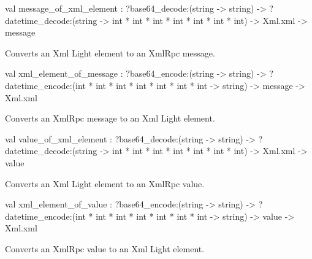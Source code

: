 \documentclass[11pt]{article}
\begin{document}
\label{val:XmlRpc.message-underscoreof-underscorexml-underscoreelement}\begin{ocamldoccode}
val message_of_xml_element :
  ?base64_decode:(string -> string) ->
  ?datetime_decode:(string -> int * int * int * int * int * int * int) ->
  Xml.xml -> message
\end{ocamldoccode}
\begin{ocamldocdescription}
Converts an Xml Light element to an XmlRpc message.


\end{ocamldocdescription}




\label{val:XmlRpc.xml-underscoreelement-underscoreof-underscoremessage}\begin{ocamldoccode}
val xml_element_of_message :
  ?base64_encode:(string -> string) ->
  ?datetime_encode:(int * int * int * int * int * int * int -> string) ->
  message -> Xml.xml
\end{ocamldoccode}
\begin{ocamldocdescription}
Converts an XmlRpc message to an Xml Light element.


\end{ocamldocdescription}




\label{val:XmlRpc.value-underscoreof-underscorexml-underscoreelement}\begin{ocamldoccode}
val value_of_xml_element :
  ?base64_decode:(string -> string) ->
  ?datetime_decode:(string -> int * int * int * int * int * int * int) ->
  Xml.xml -> value
\end{ocamldoccode}
\begin{ocamldocdescription}
Converts an Xml Light element to an XmlRpc value.


\end{ocamldocdescription}




\label{val:XmlRpc.xml-underscoreelement-underscoreof-underscorevalue}\begin{ocamldoccode}
val xml_element_of_value :
  ?base64_encode:(string -> string) ->
  ?datetime_encode:(int * int * int * int * int * int * int -> string) ->
  value -> Xml.xml
\end{ocamldoccode}
\begin{ocamldocdescription}
Converts an XmlRpc value to an Xml Light element.


\end{ocamldocdescription}
\end{document}
